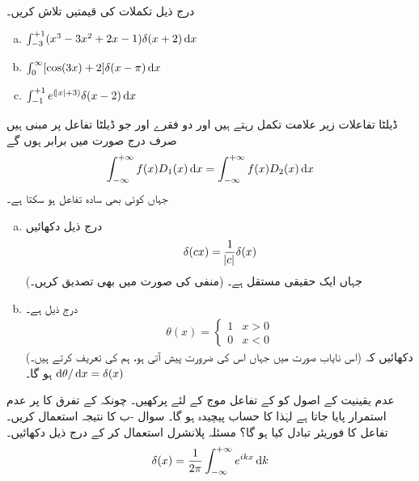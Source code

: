درج ذیل تکملات کی قیمتیں تلاش کریں۔ 
\begin{enumerate}[a.]
\item\(\int_{-3}^{+1}(x^{3}-3x^{2}+2x-1) \delta(x+2) \dif{x}\)
\item\( \int_{0}^{\infty}[\cos(3x)+2] \delta(x-\pi) \dif{x}\)
\item\(\int_{-1}^{+1}e^{(\abs x+3)} \delta (x-2) \dif{x}\)
\end{enumerate}
 ڈیلٹا تفاعلات زیر علامت تکمل رہتے ہیں اور دو فقرے  اور جو ڈیلٹا تفاعل پر مبنی ہیں صرف درج صورت میں برابر ہوں گے
\begin{align*}
\int_{-\infty}^{+\infty}f(x) D_1(x) \dif x =\int_{-\infty}^{+\infty}f(x) D_2(x) \dif x
\end{align*}
 جہاں  کوئی بھی سادہ تفاعل ہو سکتا ہے۔
\begin{enumerate}[a.]
\item 
درج ذیل دکھائیں
 \begin{align}\delta(cx)=\frac{1}{\abs{c}}\delta(x)\end{align}
جہاں  ایک حقیقی مستقل ہے۔ (منفی  کی صورت میں بھی تصدیق کریں۔) 
\item 
{} درج ذیل ہے۔
\begin{align}\label{مساوات_غیر_تابع_شروڈنگر_تھیٹا_سیڑھی_تفاعل}
\theta(x)=
\begin{cases}
1& x>0\\
0& x<0
\end{cases}
\end{align}
 (اس نایاب صورت میں جہاں اس کی ضرورت پیش آتی ہو، ہم  کی تعریف  کرتے ہیں۔) دکھائیں کہ \(\dif{\theta}/\dif{x}=\delta(x)\) ہو گا۔
\end{enumerate}
 عدم یقینیت کے اصول کو کے تفاعل موج کے لئے پرکھیں۔  چونکہ  کے تفرق کا پر عدم استمرار پایا جاتا ہے لہٰذا کا حساب پیچیدہ ہو گا۔ سوال -ب کا نتیجہ استعمال کریں۔   
 تفاعل  کا فوریئر تبادل کیا ہو گا؟ مسئلہ پلانشرل استعمال کر کے درج ذیل دکھائیں۔ 
\begin{align}\label{مساوات_شروڈنگر_ڈیلٹا_پلانشرال}
\delta(x)=\frac{1}{2\pi}\int_{-\infty}^{+\infty} e^{ikx} \dif{k}
\end{align}

